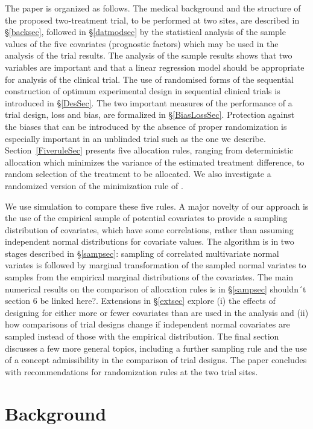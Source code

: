 \documentclass[number,12pt,review]{elsarticle}
\begin{document}
The paper is organized as follows. The medical background and the structure of the proposed two-treatment trial, to be performed at two sites,  are described in \S\ref{backsec}, followed in \S\ref{datmodsec} by the statistical analysis of the sample values of  the five covariates (prognostic factors) which may be used in the analysis of the trial results. The analysis of the sample results shows that two variables are important and that a linear regression model should be appropriate for analysis of the clinical trial. The use of randomised forms of the sequential construction of optimum experimental design in sequential clinical trials is introduced in \S\ref{DesSec}. The two important measures of the performance of a trial design, loss and bias, are formalized in \S\ref{BiasLossSec}. Protection against the biases that can be introduced by the absence of proper randomization is especially important in an unblinded trial such as the one we describe. Section~\ref{FiveruleSec} presents five allocation rules, ranging from deterministic allocation which minimizes the variance of the estimated treatment difference, to random selection of the treatment to be allocated. We also investigate a randomized version of the minimization rule of \citet{p+s:75}.

We use simulation to compare these five rules. A major novelty of our approach is the use of the empirical sample of potential covariates to provide a sampling distribution of covariates, which have some correlations, rather than assuming independent normal distributions for covariate values. The algorithm is in two stages described in \S\ref{sampsec}: sampling of correlated multivariate normal variates is followed by marginal transformation of the sampled normal variates  to samples from the empirical marginal distributions of the covariates. The main numerical results on the comparison of allocation rules is in \S\ref{sampsec} \ac{shouldn´t section 6 be linked here?}. Extensions in \S\ref{extsec} explore (i) the effects of designing for either more or fewer covariates than are used in the analysis and (ii) how comparisons of trial designs change if  independent normal covariates are sampled instead of those with the empirical distribution. The final section discusses a few more general topics, including a further sampling rule and the use of a concept admissibility in the comparison of trial designs. The paper concludes with recommendations for randomization rules at the two trial sites.

\section{Background}
\end{document}
